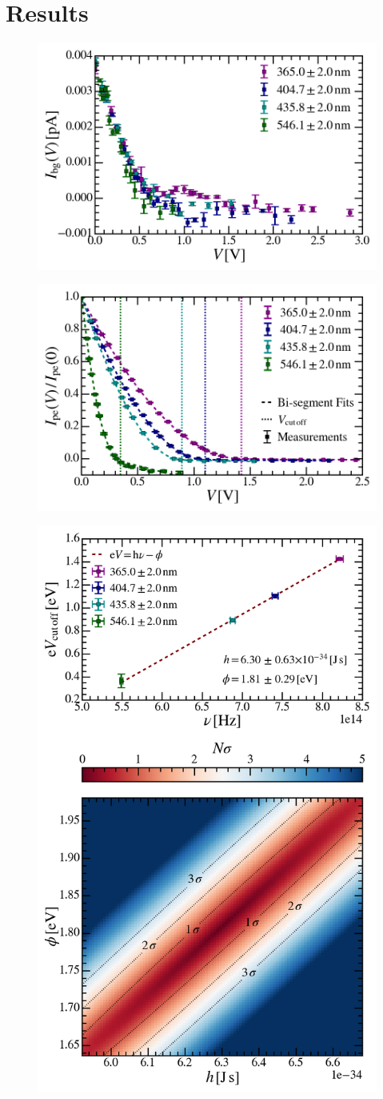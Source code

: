 \documentclass[aps,twocolumn,secnumarabic,balancelastpage,amsmath,amssymb,nofootinbib,floatfix]{revtex4-1}
\begin{document}
\section{Results}
\label{sec:result}

\begin{figure}
    \centering
    \includegraphics[width=0.49 \textwidth]{Figures/background.png}
    \caption{}
    \label{fig:background}
\end{figure}

\begin{figure}
    \centering
    \includegraphics[width=0.49 \textwidth]{Figures/measurements.png}
    \caption{}
    \label{fig:measurements}
\end{figure}

\begin{figure}
    \centering
    \includegraphics[width=0.49 \textwidth]{Figures/plank_and_work_function_fit.png}
    \caption{}
    \label{fig:h_and_phi}
\end{figure}
\end{document}
